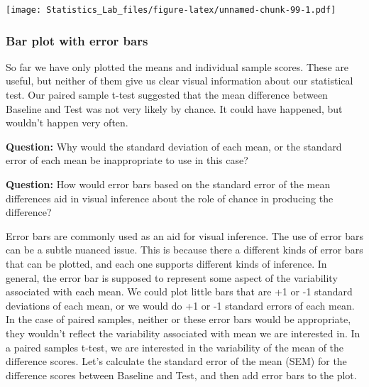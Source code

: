 \documentclass[
]{book}
\begin{document}
\texttt{[image: Statistics\_Lab\_files/figure-latex/unnamed-chunk-99-1.pdf]}

\hypertarget{bar-plot-with-error-bars}{%
\subsubsection{Bar plot with error bars}\label{bar-plot-with-error-bars}}

So far we have only plotted the means and individual sample scores. These are useful, but neither of them give us clear visual information about our statistical test. Our paired sample t-test suggested that the mean difference between Baseline and Test was not very likely by chance. It could have happened, but wouldn't happen very often.

\textbf{Question:} Why would the standard deviation of each mean, or the standard error of each mean be inappropriate to use in this case?

\textbf{Question:} How would error bars based on the standard error of the mean differences aid in visual inference about the role of chance in producing the difference?

Error bars are commonly used as an aid for visual inference. The use of error bars can be a subtle nuanced issue. This is because there a different kinds of error bars that can be plotted, and each one supports different kinds of inference. In general, the error bar is supposed to represent some aspect of the variability associated with each mean. We could plot little bars that are +1 or -1 standard deviations of each mean, or we would do +1 or -1 standard errors of each mean. In the case of paired samples, neither or these error bars would be appropriate, they wouldn't reflect the variability associated with mean we are interested in. In a paired samples t-test, we are interested in the variability of the mean of the difference scores. Let's calculate the standard error of the mean (SEM) for the difference scores between Baseline and Test, and then add error bars to the plot.
\end{document}
